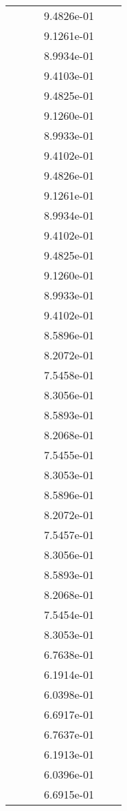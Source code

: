 \begin{xltabular}{\textwidth}{r|rS[table-format=1.3e+2]S[table-format=1.4e+2]S[table-format=1.4e+2]S[table-format=-1.5]}
&  &  & 9.4826e-01 & & \\
&  &  & 9.1261e-01 & & \\
&  &  & 8.9934e-01 & & \\
&  &  & 9.4103e-01 & & \\
&  &  & 9.4825e-01 & & \\
&  &  & 9.1260e-01 & & \\
&  &  & 8.9933e-01 & & \\
&  &  & 9.4102e-01 & & \\
&  &  & 9.4826e-01 & & \\
&  &  & 9.1261e-01 & & \\
&  &  & 8.9934e-01 & & \\
&  &  & 9.4102e-01 & & \\
&  &  & 9.4825e-01 & & \\
&  &  & 9.1260e-01 & & \\
&  &  & 8.9933e-01 & & \\
&  &  & 9.4102e-01 & & \\
&  &  & 8.5896e-01 & & \\
&  &  & 8.2072e-01 & & \\
&  &  & 7.5458e-01 & & \\
&  &  & 8.3056e-01 & & \\
&  &  & 8.5893e-01 & & \\
&  &  & 8.2068e-01 & & \\
&  &  & 7.5455e-01 & & \\
&  &  & 8.3053e-01 & & \\
&  &  & 8.5896e-01 & & \\
&  &  & 8.2072e-01 & & \\
&  &  & 7.5457e-01 & & \\
&  &  & 8.3056e-01 & & \\
&  &  & 8.5893e-01 & & \\
&  &  & 8.2068e-01 & & \\
&  &  & 7.5454e-01 & & \\
&  &  & 8.3053e-01 & & \\
&  &  & 6.7638e-01 & & \\
&  &  & 6.1914e-01 & & \\
&  &  & 6.0398e-01 & & \\
&  &  & 6.6917e-01 & & \\
&  &  & 6.7637e-01 & & \\
&  &  & 6.1913e-01 & & \\
&  &  & 6.0396e-01 & & \\
&  &  & 6.6915e-01 & & \\

\end{xltabular}
